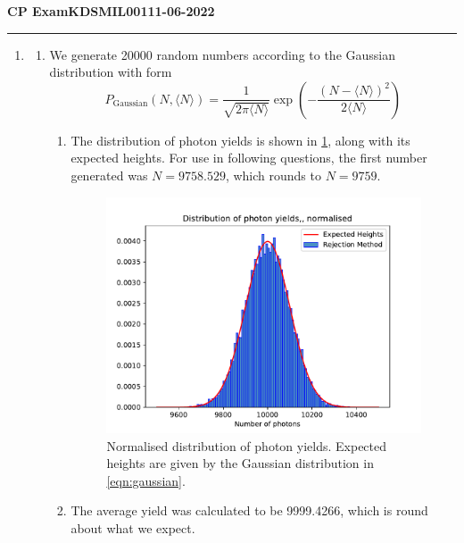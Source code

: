 \documentclass[11pt]{article}
\begin{document}
\begin{center}
    \textbf{CP Exam}\hspace{1.5in}\textbf{KDSMIL001}\hspace{1.5in}\textbf{11-06-2022}
\end{center}
\rule{\textwidth}{1pt}

\begin{enumerate}
    \item \begin{enumerate}
        \item We generate \num[]{20000} random numbers according to the Gaussian distribution with form 
        \begin{equation}
            P_{\mathrm{Gaussian}}(N,\langle N \rangle)=\frac{1}{\sqrt{2\pi\langle N \rangle}}\exp\left(-\frac{(N-\langle N \rangle)^2}{2\langle N \rangle}\right)
            \label{eqn:gaussian}
        \end{equation}

        \begin{enumerate}
            \item The distribution of photon yields is shown in \cref{fig:q1a}, along with its expected heights. For use in following questions, the first number generated was $N=\num[]{9758.529}$, which rounds to $N=\num[]{9759}$.

            \begin{figure}[H]
                \begin{center}
                    \includegraphics[width=.6\textwidth]{Plots/q1a.pdf}
                    \caption{Normalised distribution of photon yields. Expected heights are given by the Gaussian distribution in \cref{eqn:gaussian}.}
                    \label{fig:q1a}
                \end{center}
            \end{figure}
            
            \item The average yield was calculated to be \num[]{9999.4266}, which is round about what we expect.
            

\end{enumerate}
\end{enumerate}
\end{enumerate}
\end{document}
